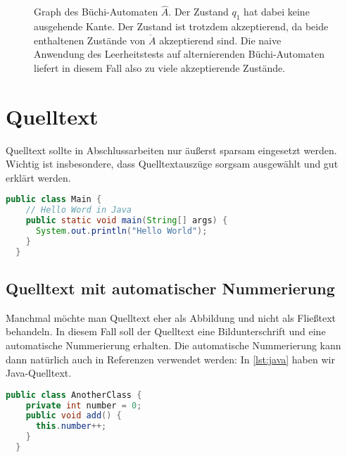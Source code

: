 \begin{figure}
  \centering
  \caption[Graph des Büchi-Automaten $\hat A$.]{Graph des Büchi-Automaten $\hat A$. Der Zustand $q_1$ hat dabei keine ausgehende Kante. Der Zustand ist trotzdem akzeptierend, da beide enthaltenen Zustände von $\acute A$ akzeptierend sind. Die naive Anwendung des Leerheitstests auf alternierenden Büchi-Automaten liefert in diesem Fall also zu viele akzeptierende Zustände.}
  \label{fig-buechi}
\end{figure}

\section{Quelltext}

Quelltext sollte in Abschlussarbeiten nur äußerst sparsam eingesetzt werden. Wichtig ist insbesondere, dass Quelltextauszüge sorgsam ausgewählt und gut erklärt werden.

\begin{lstlisting}[language=Java,gobble=2]
  public class Main {
    // Hello Word in Java
    public static void main(String[] args) {
      System.out.println("Hello World");
    }
  }
\end{lstlisting}

\subsection{Quelltext mit automatischer Nummerierung}

Manchmal möchte man Quelltext eher als Abbildung und nicht als Fließtext behandeln. In diesem Fall soll der Quelltext eine Bildunterschrift und eine automatische Nummerierung erhalten. Die automatische Nummerierung kann dann natürlich auch in Referenzen verwendet werden: In \vref{lst:java} haben wir Java-Quelltext.

\begin{lstlisting}[language=Java,gobble=2,caption={Ich bin die Bildunterschrift des Quelltextes},label=lst:java]
  public class AnotherClass {
    private int number = 0;
    public void add() {
      this.number++;
    }
  }
\end{lstlisting}


